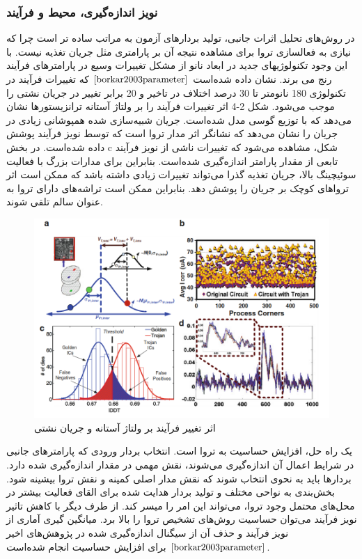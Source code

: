 \subsubsection {نویز اندازه‌گیری، محیط و فرآیند}
در روش‌های تحلیل اثرات جانبی، تولید بردارهای آزمون به مراتب ساده تر است چرا که نیازی به فعالسازی تروا برای مشاهده نتیجه آن بر پارامتری مثل جریان تغذیه نیست. با این وجود تکنولوژیهای جدید در ابعاد نانو از مشکل تغییرات وسیع در پارامترهای فرآیند رنج می برند. نشان داده شده‌است $\cite{borkar2003parameter}$ که تغییرات فرآیند در تکنولوژی 180 نانومتر تا 30 درصد اختلاف در تاخیر و 20 برابر تغییر در جریان نشتی را موجب می‌شود. شکل 2-4 اثر تغییرات فرآیند را بر ولتاژ آستانه ترانزیستورها نشان می‌دهد که با توزیع گوسی مدل شده‌است. جریان شبیه‌سازی شده همپوشانی زیادی در جریان را نشان می‌دهد که نشانگر اثر مدار تروا است که توسط نویز فرآیند پوشش داده شده‌است. در بخش c شکل، مشاهده می‌شود که تغییرات ناشی از نویز فرآیند تابعی از مقدار پارامتر اندازه‌گیری شده‌است. بنابراین برای مدارات بزرگ با فعالیت سوئیچینگ بالا، جریان تغذیه گذرا می‌تواند تغییرات زیادی داشته باشد که ممکن است اثر تروا‌های کوچک بر جریان را پوشش دهد. بنابراین ممکن است تراشه‌های دارای تروا به عنوان سالم تلقی شوند. 

\begin{figure}
	\begin{center}
		\includegraphics[scale=0.7]{figs/fig3-4.png}
		\caption[اثر تغییر فرآیند بر ولتاژ آستانه و جریان نشتی]
		{اثر تغییر فرآیند بر ولتاژ آستانه و جریان نشتی \cite{borkar2003parameter}}
		\label{fig3-4}
	\end{center}
\end{figure}
یک راه حل، افزایش حساسیت به تروا است. انتخاب بردار ورودی که پارامترهای جانبی در شرایط اعمال آن اندازه‌گیری می‌شوند، نقش مهمی در مقدار اندازه‌گیری شده دارد. بردارها باید به نحوی انتخاب شوند که نقش مدار اصلی کمینه و نقش تروا بیشینه شود. بخش‌بندی به نواحی مختلف و تولید بردار هدایت شده برای القای فعالیت بیشتر در محل‌های محتمل وجود تروا، می‌تواند این امر را میسر کند. از طرف دیگر با کاهش تاثیر نویز فرآیند می‌توان حساسیت روش‌های تشخیص تروا را بالا برد. میانگین گیری آماری از نویز فرآیند و حذف آن از سیگنال اندازه‌گیری شده در پژوهش‌های اخیر $\cite{borkar2003parameter}$ برای افزایش حساسیت انجام شده‌است.

